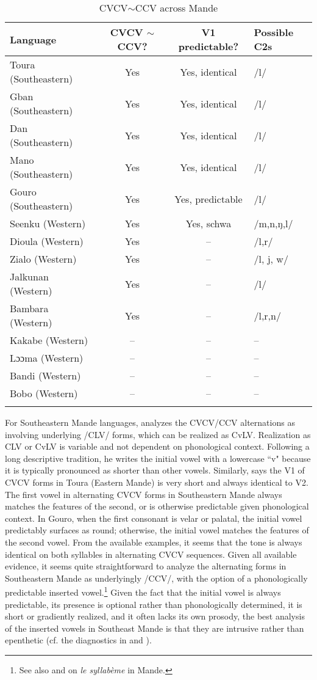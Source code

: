 \documentclass[output=paper,colorlinks,citecolor=brown]{langscibook}
\begin{document}
\begin{table}
\caption{CVCV$\sim$CCV across Mande}
\label{mandecvcv}
\begin{tabularx}{\textwidth}{Xccl}
	\lsptoprule
	Language & CVCV $\sim$ CCV? & V1 predictable? & Possible C2s\\
	\midrule
    Toura (Southeastern) & Yes & Yes, identical & /l/ \\
	Gban (Southeastern) & Yes & Yes, identical & /l/\\
	Dan (Southeastern) & Yes & Yes, identical & /l/\\
	Mano (Southeastern) & Yes & Yes, identical & /l/\\
	Gouro (Southeastern) & Yes & Yes, predictable & /l/\\
	Seenku (Western) & Yes & Yes, schwa & /m,n,ŋ,l/\\
	Dioula (Western) & Yes & -- & /l,r/\\
	Zialo (Western) & Yes & -- & /l, j, w/ \\
	Jalkunan (Western) & Yes & -- & /l/\\
	Bambara (Western) & Yes & -- & /l,r,n/\\
	Kakabe (Western) & -- & -- & -- \\
	Lɔɔma (Western) & -- & -- & -- \\
	Bandi (Western) & -- & -- & --\\
	Bobo (Western) & -- & -- & --\\
	\lspbottomrule
	\end{tabularx}
\end{table}


For Southeastern Mande languages, \citet{Vydrine:2004} analyzes the CVCV\slash CCV alternations as involving underlying /CLV/ forms, which can be realized as CvLV. Realization as CLV or CvLV is variable and not dependent on phonological context. Following a long descriptive tradition, he writes the initial vowel with a lowercase ``v" because it is typically pronounced as shorter than other vowels. Similarly, \citet[54--56]{Bearth:1971} says the V1 of CVCV forms in Toura (Eastern Mande) is very short and always identical to V2. The first vowel in alternating CVCV forms in Southeastern Mande always matches the features of the second, or is otherwise predictable given phonological context. In Gouro, when the first consonant is velar or palatal, the initial vowel predictably surfaces as round; otherwise, the initial vowel matches the features of the second vowel. From the available examples, it seems that the tone is always identical on both syllables in alternating CVCV sequences. Given all available evidence, it seems quite straightforward to analyze the alternating forms in Southeastern Mande as underlyingly /CCV/, with the option of a phonologically predictable inserted vowel.\footnote{See also \citet{LeSaout:1979} and \citet{Vydrine:2010} on \textit{le syllabème} in Mande.} Given the fact that the initial vowel is always predictable, its presence is optional rather than phonologically determined, it is short or gradiently realized, and it often lacks its own prosody, the best analysis of the inserted vowels in Southeast Mande is that they are intrusive rather than epenthetic (cf. the diagnostics in  and ). 
\end{document}
